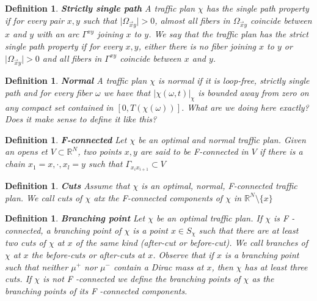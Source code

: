 \documentclass[11pt,reqno,a4paper]{amsart}
\numberwithin{equation}{section}
\theoremstyle{mytheorem}
\newtheorem{definition}[subsubsection]{Definition}
\theoremstyle{myremark}
\theoremstyle{myparagraph}
\newcommand{\R}{\mathbb{R}}
\begin{document}
    \begin{definition}
        \textbf{Strictly single path}
        A \textit{traffic plan} $\chi$ has the \textit{single path property} if for every pair $x, y$ such that
        $\lvert \Omega_{\overset{\rightarrow}{x}y} \rvert > 0$, almost all fibers in $\Omega_{\overset{\rightarrow}{x}y}$
        coincide between $x$ and $y$ with an arc $\Gamma^{xy}$ joining $x$ to $y$. We say that the traffic plan has
        the \textit{strict single path property} if for every $x, y$, either there is no fiber joining $x$ to $y$
        or $\lvert \Omega_{\overset{\rightarrow}{x}y} \rvert > 0$ and all fibers in $\Gamma^{xy}$ coincide between $x$ and $y$.
    \end{definition}



    \begin{definition}
        \textbf{Normal}
        A traffic plan $\chi$ is normal if it is loop-free, strictly single path and for every fiber $\omega$
        we have that $| \chi(\omega, t)|_\chi$ is bounded away from zero on any compact set contained in $[0, T(\chi(\omega))]$.
            {\color{teal} What are we doing here exactly? Does it make sense to define it like this?}
    \end{definition}

    \begin{definition}
        \textbf{F-connected}
        Let $\chi$ be an optimal and normal traffic plan. Given an opens et $V \subset \R^N$, two points $x,y$ are said to be F-connected in $V$
        if there is a chain $x_1=x,\cdot, x_l= y$ such that $\Gamma_{x_{i}x_{i+1}} \subset V$
    \end{definition}

    \begin{definition}
        \textbf{Cuts}
        Assume that $\chi$ is an optimal, normal, F-connected traffic plan. We call cuts of $\chi$ atx the F-connected components of
        $\chi$ in $\R^N \setminus \{x\}$
    \end{definition}

    \begin{definition}
        \textbf{Branching point}
        Let $\chi$ be an optimal traffic plan. If $\chi$ is F -connected, a branching point of $\chi$ is a point $x \in S_{\chi}$ such that
        there are at least two cuts of $\chi$ at $x$ of the same kind (after-cut or before-cut).
        We call branches of $\chi$ at $x$ the before-cuts or after-cuts at $x$.
        Observe that if $x$ is a branching point such that neither $\mu^+$ nor $\mu^-$ contain a Dirac mass at $x$, then $\chi$ has at least
        three cuts.
        If $\chi$ is not F -connected we define the branching points of $\chi$ as the branching points of its F -connected components.
    \end{definition}
\end{document}
